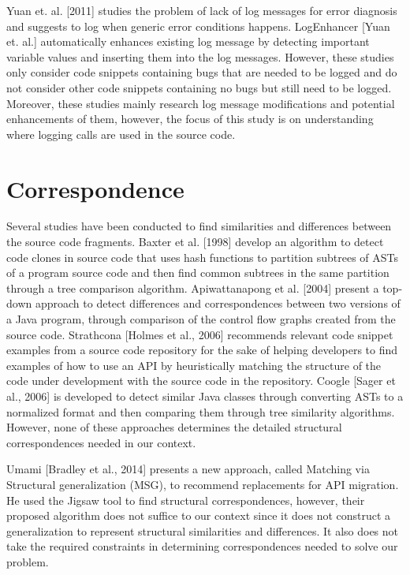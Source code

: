 Yuan et. al. [2011] studies the problem of lack of log messages for error diagnosis and suggests to log when generic error conditions happens. LogEnhancer [Yuan et. al.] automatically enhances existing log message by detecting important variable values and inserting them into the log messages. However, these studies only consider code snippets containing bugs that are needed to be logged and do not consider other code snippets containing no bugs but still need to be logged. Moreover, these studies mainly research log message modifications and potential enhancements of them, however, the focus of this study is on understanding where logging calls are used in the source code. 

\section{Correspondence}  \label{ch7-corr}

Several studies have been conducted to find similarities and differences between the source code fragments. Baxter et al. [1998] develop an algorithm to detect code clones in source code that uses hash functions to partition subtrees of ASTs of a program source code and then find common subtrees in the same partition through a tree comparison algorithm. Apiwattanapong et al. [2004] present a top-down approach to detect differences and correspondences between two versions of a Java program, through comparison of the control flow graphs created from the source code. Strathcona [Holmes et al., 2006] recommends relevant code snippet examples from a source code repository for the sake of helping developers to find examples of how to use an API by heuristically matching the structure of the code under development with the source code in the repository. Coogle [Sager et al., 2006] is developed to detect similar Java classes through converting ASTs to a normalized format and then comparing them through tree similarity algorithms. However, none of these approaches determines the detailed structural correspondences needed in our context. 

Umami [Bradley et al., 2014] presents a new approach, called Matching via Structural generalization (MSG), to recommend replacements for API migration. He used the Jigsaw tool to find structural correspondences, however, their proposed algorithm does not suffice to our context since it does not construct a generalization to represent structural similarities and differences. It also does not take the required constraints in determining correspondences needed to solve our problem.

